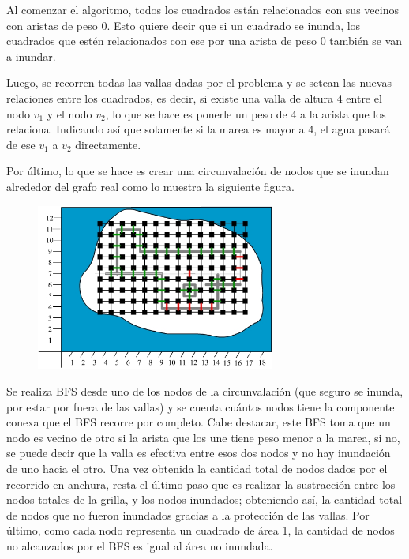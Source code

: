 \documentclass[a4paper, 12pt]{article}
\begin{document}
Al comenzar el algoritmo, todos los cuadrados están relacionados con sus vecinos con aristas de peso 0. Esto quiere decir que si un cuadrado se inunda, los cuadrados que estén relacionados con ese por una arista de peso 0 también se van a inundar. 

Luego, se recorren todas las vallas dadas por el problema y se setean las nuevas relaciones entre los cuadrados, es decir, si existe una valla de altura 4 entre el nodo $v_1$ y el nodo $v_2$, lo que se hace es ponerle un peso de 4 a la arista que los relaciona. Indicando así que solamente si la marea es mayor a 4, el agua pasará de ese $v_1$ a $v_2$ directamente.

Por último, lo que se hace es crear una circunvalación de nodos que se inundan alrededor del grafo real como lo muestra la siguiente figura.

\begin{figure}[H]
\centering
\includegraphics[width=0.7\textwidth]{imagenes/im3_ej2.jpg} 
\end{figure}

Se realiza BFS desde uno de los nodos de la circunvalación (que seguro se inunda, por estar por fuera de las vallas) y se cuenta cuántos nodos tiene la componente conexa que el BFS recorre por completo. Cabe destacar, este BFS toma que un nodo es vecino de otro si la arista que los une tiene peso menor a la marea, si no, se puede decir que la valla es efectiva entre esos dos nodos y no hay inundación de uno hacia el otro. Una vez obtenida la cantidad total de nodos dados por el recorrido en anchura, resta el último paso que es realizar la sustracción entre los nodos totales de la grilla, y los nodos inundados; obteniendo así, la cantidad total de nodos que no fueron inundados gracias a la protección de las vallas. Por último, como cada nodo representa un cuadrado de área 1, la cantidad de nodos no alcanzados por el BFS es igual al área no inundada.
\end{document}
